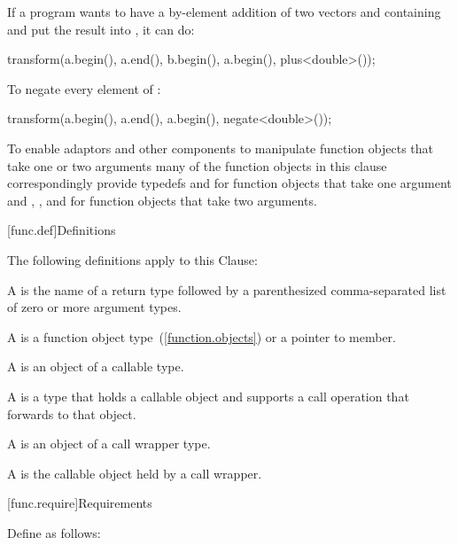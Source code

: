\pnum
\enterexample
If a \Cpp program wants to have a by-element addition of two vectors 
and  containing  and put the result into ,
it can do:

\begin{codeblock}
transform(a.begin(), a.end(), b.begin(), a.begin(), plus<double>());
\end{codeblock}
\exitexample

\pnum
\enterexample
To negate every element of :

\begin{codeblock}
transform(a.begin(), a.end(), a.begin(), negate<double>());
\end{codeblock}

\exitexample

\pnum
\enternote
To enable adaptors and other components to manipulate function objects that
take one or two arguments many of the function objects in this clause
correspondingly provide typedefs
and
for function objects that take one argument and ,
, and  for function objects
that take two arguments.
\exitnote

[func.def]{Definitions}

\pnum
The following definitions apply to this Clause:

\pnum
{}%
A  is the name of a return type followed by a
parenthesized comma-separated list of zero or more argument types.

\pnum
{}%
A  is a function object type~(\ref{function.objects}) or a pointer to member.

\pnum
{}%
A  is an object of a callable type.

\pnum
{}%
A  is a type that holds a callable object
and supports a call operation that forwards to that object.

\pnum
{}%
A  is an object of a call wrapper type.

\pnum
{}%
A  is the callable object held by a call wrapper.

[func.require]{Requirements}

\pnum
{}%
Define  as follows:


